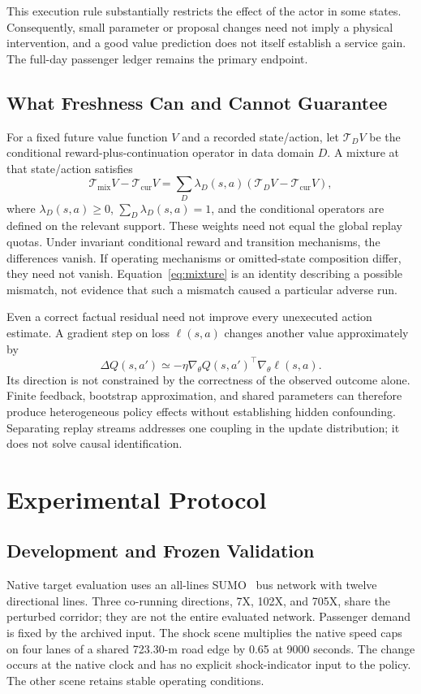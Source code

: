 \documentclass[journal]{IEEEtran}
\begin{document}
This execution rule substantially restricts the effect of the actor in some states. Consequently, small parameter or proposal changes need not imply a physical intervention, and a good value prediction does not itself establish a service gain. The full-day passenger ledger remains the primary endpoint.

\subsection{What Freshness Can and Cannot Guarantee}
For a fixed future value function $V$ and a recorded state/action, let $\mathcal T_DV$ be the conditional reward-plus-continuation operator in data domain $D$. A mixture at that state/action satisfies
\begin{equation}
 \mathcal T_{\mathrm{mix}}V-\mathcal T_{\mathrm{cur}}V
 =\sum_D\lambda_D(s,a)(\mathcal T_DV-\mathcal T_{\mathrm{cur}}V), \label{eq:mixture}
\end{equation}
where $\lambda_D(s,a)\geq0$, $\sum_D\lambda_D(s,a)=1$, and the conditional operators are defined on the relevant support. These weights need not equal the global replay quotas. Under invariant conditional reward and transition mechanisms, the differences vanish. If operating mechanisms or omitted-state composition differ, they need not vanish. Equation~\eqref{eq:mixture} is an identity describing a possible mismatch, not evidence that such a mismatch caused a particular adverse run.

Even a correct factual residual need not improve every unexecuted action estimate. A gradient step on loss $\ell(s,a)$ changes another value approximately by
\begin{equation}
 \Delta Q(s,a')\simeq-\eta\nabla_\theta Q(s,a')^\top
                                  \nabla_\theta\ell(s,a).
\end{equation}
Its direction is not constrained by the correctness of the observed outcome alone. Finite feedback, bootstrap approximation, and shared parameters can therefore produce heterogeneous policy effects without establishing hidden confounding. Separating replay streams addresses one coupling in the update distribution; it does not solve causal identification.

\section{Experimental Protocol}
\subsection{Development and Frozen Validation}
Native target evaluation uses an all-lines SUMO~\cite{sumo2018} bus network with twelve directional lines. Three co-running directions, 7X, 102X, and 705X, share the perturbed corridor; they are not the entire evaluated network. Passenger demand is fixed by the archived input. The shock scene multiplies the native speed caps on four lanes of a shared 723.30-m road edge by 0.65 at 9000 seconds. The change occurs at the native clock and has no explicit shock-indicator input to the policy. The other scene retains stable operating conditions.
\end{document}
